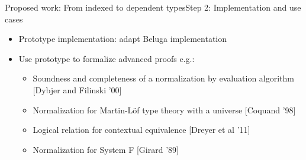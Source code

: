 \documentclass[usenames,dvipsnames]{beamer}
\begin{document}
\begin{frame}{Proposed work: From indexed to dependent types}{Step 2: Implementation and use cases}
\begin{itemize}
\item Prototype implementation: adapt Beluga implementation
\item Use prototype to formalize advanced proofs e.g.:
\begin{itemize}
\item Soundness and completeness of a normalization by evaluation algorithm [Dybjer and Filinski '00]
\item Normalization for Martin-L\"of type theory with a universe [Coquand '98]
\item Logical relation for contextual equivalence [Dreyer et al '11]
\item Normalization for System F [Girard '89]
\end{itemize}
\end{itemize}
\end{frame}

\end{document}

